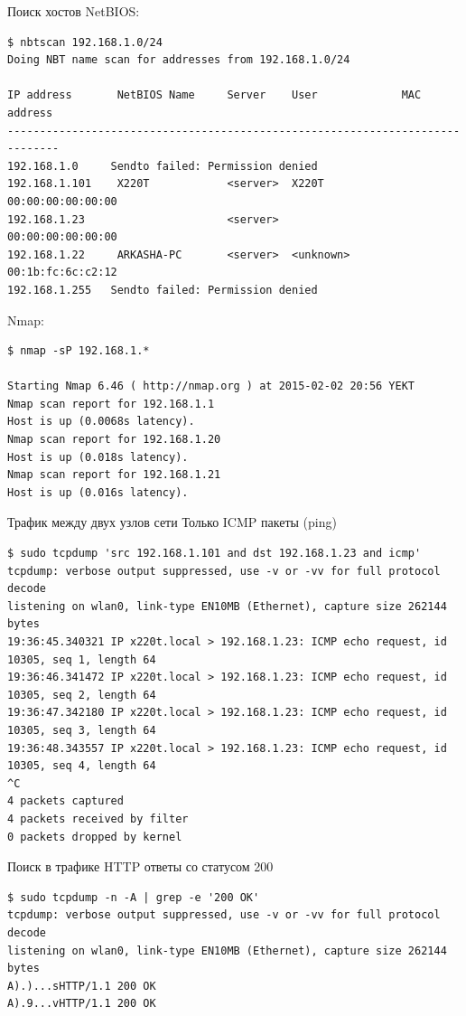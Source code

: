 \begin{frame}[fragile]{Поиск хостов}
    NetBIOS:
    \begin{Verbatim}[fontsize=\scriptsize]
$ nbtscan 192.168.1.0/24
Doing NBT name scan for addresses from 192.168.1.0/24

IP address       NetBIOS Name     Server    User             MAC address
------------------------------------------------------------------------------
192.168.1.0     Sendto failed: Permission denied
192.168.1.101    X220T            <server>  X220T            00:00:00:00:00:00
192.168.1.23                      <server>                   00:00:00:00:00:00
192.168.1.22     ARKASHA-PC       <server>  <unknown>        00:1b:fc:6c:c2:12
192.168.1.255   Sendto failed: Permission denied
    \end{Verbatim}
    Nmap:
    \begin{Verbatim}[fontsize=\scriptsize]
$ nmap -sP 192.168.1.*

Starting Nmap 6.46 ( http://nmap.org ) at 2015-02-02 20:56 YEKT
Nmap scan report for 192.168.1.1
Host is up (0.0068s latency).
Nmap scan report for 192.168.1.20
Host is up (0.018s latency).
Nmap scan report for 192.168.1.21
Host is up (0.016s latency).
    \end{Verbatim}
\end{frame}

\begin{frame}[fragile]{Трафик между двух узлов сети}
    Только ICMP пакеты (ping)
    \begin{Verbatim}[fontsize=\scriptsize]
$ sudo tcpdump 'src 192.168.1.101 and dst 192.168.1.23 and icmp'
tcpdump: verbose output suppressed, use -v or -vv for full protocol decode
listening on wlan0, link-type EN10MB (Ethernet), capture size 262144 bytes
19:36:45.340321 IP x220t.local > 192.168.1.23: ICMP echo request, id 10305, seq 1, length 64
19:36:46.341472 IP x220t.local > 192.168.1.23: ICMP echo request, id 10305, seq 2, length 64
19:36:47.342180 IP x220t.local > 192.168.1.23: ICMP echo request, id 10305, seq 3, length 64
19:36:48.343557 IP x220t.local > 192.168.1.23: ICMP echo request, id 10305, seq 4, length 64
^C
4 packets captured
4 packets received by filter
0 packets dropped by kernel
    \end{Verbatim}
\end{frame}

\begin{frame}[fragile]{Поиск в трафике}
    HTTP ответы со статусом 200
    \begin{Verbatim}[fontsize=\scriptsize]
$ sudo tcpdump -n -A | grep -e '200 OK'
tcpdump: verbose output suppressed, use -v or -vv for full protocol decode
listening on wlan0, link-type EN10MB (Ethernet), capture size 262144 bytes
A).)...sHTTP/1.1 200 OK
A).9...vHTTP/1.1 200 OK
    \end{Verbatim}
\end{frame}

